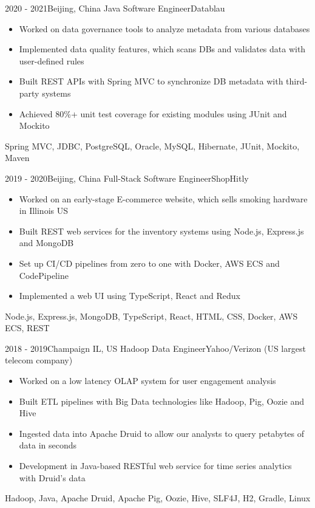 \documentclass[localFont,alternative]{resume_template}
\begin{document}
\begin{experiences}
    \experience
    {2020 - 2021}{Beijing, China}
    {Java Software Engineer}{Datablau}
    {
        \begin{itemize}
        \item Worked on data governance tools to analyze metadata from various databases
        \item Implemented data quality features, which scans DBs and validates data with user-defined rules
        \item Built REST APIs with Spring MVC to synchronize DB metadata with third-party systems
        \item Achieved 80\%+ unit test coverage for existing modules using JUnit and Mockito
        \end{itemize}
    }
    {Spring MVC, JDBC, PostgreSQL, Oracle, MySQL, Hibernate, JUnit, Mockito, Maven}
    
    \emptySeparator
    
    \experience
    {2019 - 2020}{Beijing, China}
    {Full-Stack Software Engineer}{ShopHitly}
    {
        \begin{itemize}
        \item Worked on an early-stage E-commerce website, which sells smoking hardware in Illinois US
        \item Built REST web services for the inventory systems using Node.js, Express.js and MongoDB
        \item Set up CI/CD pipelines from zero to one with Docker, AWS ECS and CodePipeline
        \item Implemented a web UI using TypeScript, React and Redux
        \end{itemize}
    }
    {Node.js, Express.js, MongoDB, TypeScript, React, HTML, CSS, Docker, AWS ECS, REST}
    
    \emptySeparator
    
    \experience
    {2018 - 2019}{Champaign IL, US}
    {Hadoop Data Engineer}{Yahoo/Verizon (US largest telecom company)}
    {
        \begin{itemize}
        \item Worked on a low latency OLAP system for user engagement analysis
        \item Built ETL pipelines with Big Data technologies like Hadoop, Pig, Oozie and Hive
        \item Ingested data into Apache Druid to allow our analysts to query petabytes of data in seconds
        \item Development in Java-based RESTful web service for time series analytics with Druid's data
        \end{itemize}
    }
    {Hadoop, Java, Apache Druid, Apache Pig, Oozie, Hive, SLF4J, H2, Gradle, Linux}
    
    \end{experiences}
\end{document}
